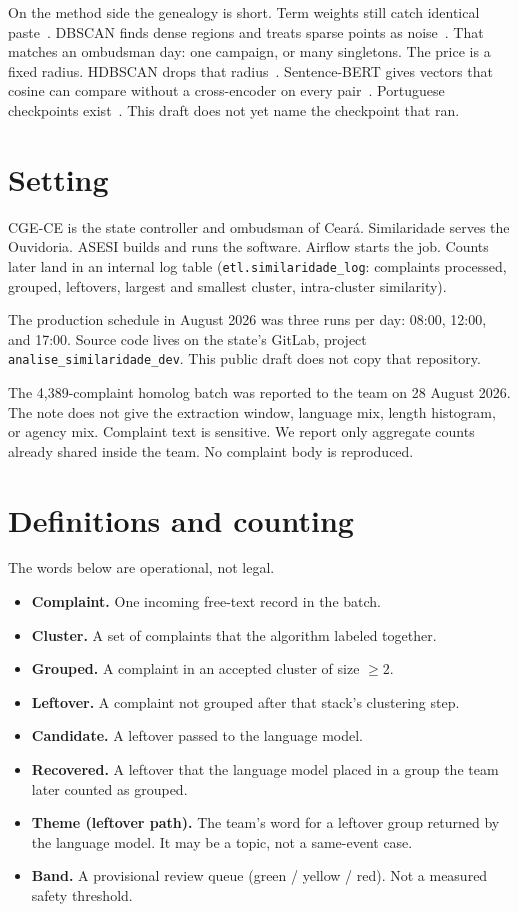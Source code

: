 \documentclass[acmlarge,screen]{acmart}
\begin{document}
On the method side the genealogy is short. Term weights still catch identical paste~\cite{salton1988term}. DBSCAN finds dense regions and treats sparse points as noise~\cite{ester1996dbscan,schubert2017dbscan}. That matches an ombudsman day: one campaign, or many singletons. The price is a fixed radius. HDBSCAN drops that radius~\cite{campello2013hdbscan,mcinnes2017hdbscan}. Sentence-BERT gives vectors that cosine can compare without a cross-encoder on every pair~\cite{reimers2019sbert}. Portuguese checkpoints exist~\cite{souza2020bertimbau}. This draft does not yet name the checkpoint that ran.

\section{Setting}

CGE-CE is the state controller and ombudsman of Cear\'{a}. Similaridade serves the Ouvidoria. ASESI builds and runs the software. Airflow starts the job. Counts later land in an internal log table (\texttt{etl.similaridade\_log}: complaints processed, grouped, leftovers, largest and smallest cluster, intra-cluster similarity).

The production schedule in August 2026 was three runs per day: 08:00, 12:00, and 17:00. Source code lives on the state's GitLab, project \texttt{analise\_similaridade\_dev}. This public draft does not copy that repository.

The 4{,}389-complaint homolog batch was reported to the team on 28 August 2026. The note does not give the extraction window, language mix, length histogram, or agency mix. Complaint text is sensitive. We report only aggregate counts already shared inside the team. No complaint body is reproduced.

\section{Definitions and counting}

The words below are operational, not legal.

\begin{itemize}
\item \textbf{Complaint.} One incoming free-text record in the batch.
\item \textbf{Cluster.} A set of complaints that the algorithm labeled together.
\item \textbf{Grouped.} A complaint in an accepted cluster of size $\ge 2$.
\item \textbf{Leftover.} A complaint not grouped after that stack's clustering step.
\item \textbf{Candidate.} A leftover passed to the language model.
\item \textbf{Recovered.} A leftover that the language model placed in a group the team later counted as grouped.
\item \textbf{Theme (leftover path).} The team's word for a leftover group returned by the language model. It may be a topic, not a same-event case.
\item \textbf{Band.} A provisional review queue (green / yellow / red). Not a measured safety threshold.
\end{itemize}
\end{document}
